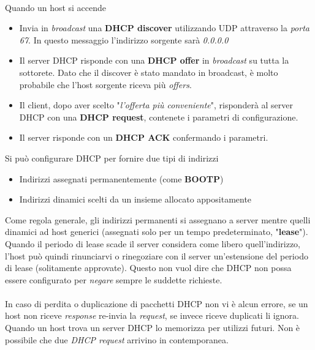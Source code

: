 \documentclass{article}
\begin{document}
            \\
            Quando un host si accende
            \begin{itemize}
                \item Invia in \textit{broadcast} una \textbf{DHCP discover} utilizzando UDP attraverso la \textit{porta 67}. In questo messaggio l'indirizzo sorgente sarà \textit{0.0.0.0}
                \item Il server DHCP risponde con una \textbf{DHCP offer} in \textit{broadcast} su tutta la sottorete. Dato che il discover è stato mandato in broadcast, è molto probabile che l'host sorgente riceva più \textit{offers}.
                \item Il client, dopo aver scelto "\textit{l'offerta più conveniente}", risponderà al server DHCP con una \textbf{DHCP request}, contenete i parametri di configurazione.
                \item Il server risponde con un \textbf{DHCP ACK} confermando i parametri. 
                      
            \end{itemize}
            Si può configurare DHCP per fornire due tipi di indirizzi
            \begin{itemize}
                \item Indirizzi assegnati permanentemente (come \textbf{BOOTP})
                \item Indirizzi dinamici scelti da un insieme allocato appositamente
            \end{itemize}
            Come regola generale, gli indirizzi permanenti si assegnano a server mentre quelli dinamici ad host generici (assegnati solo per un tempo predeterminato, "\textbf{lease}").\\
            Quando il periodo di lease scade il server considera come libero quell'indirizzo, l'host può quindi rinunciarvi o rinegoziare con il server un'estensione del periodo di lease (solitamente approvate). Questo non vuol dire che DHCP non possa essere configurato per \textit{negare} sempre le suddette richieste.\\
            \\
            In caso di perdita o duplicazione di pacchetti DHCP non vi è alcun errore, se un host non riceve \textit{response} re-invia la \textit{request}, se invece riceve duplicati li ignora.\\
            Quando un host trova un server DHCP lo memorizza per utilizzi futuri. Non è possibile che due \textit{DHCP request} arrivino in contemporanea.
            
\end{document}
